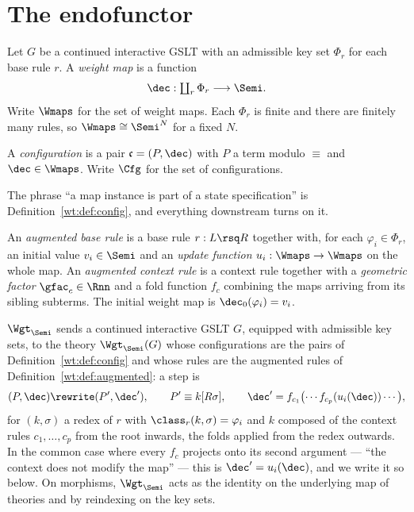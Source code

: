 \section{The endofunctor}

\begin{definition}
\label{wt:def:wmap}
Let $G$ be a continued interactive GSLT with an admissible key set $\Phi_r$ for each base
rule $r$. A \emph{weight map} is a function
\[
  \dec : \textstyle\coprod_r \Phi_r \longrightarrow \Semi .
\]
Write $\Wmaps$ for the set of weight maps. Each $\Phi_r$ is finite and there are finitely
many rules, so $\Wmaps \cong \Semi^N$ for a fixed $N$.
\end{definition}

\begin{definition}[Configuration]
\label{wt:def:config}
A \emph{configuration} is a pair $\mathfrak{c} = (P, \dec)$ with $P$ a term modulo
$\equiv$ and $\dec \in \Wmaps$. Write $\Cfg$ for the set of configurations.
\end{definition}

The phrase ``a map instance is part of a state specification'' is
Definition~\ref{wt:def:config}, and everything downstream turns on it.

\begin{definition}
\label{wt:def:augmented}
An \emph{augmented base rule} is a base rule $r : L \rsq R$ together with, for each
$\varphi_i \in \Phi_r$, an initial value $v_i \in \Semi$ and an \emph{update function}
$u_i : \Wmaps \to \Wmaps$ on the whole map. An \emph{augmented context rule} is a context
rule together with a \emph{geometric factor} $\gfac_c \in \Rnn$ and a fold function
$f_c$ combining the maps arriving from its sibling subterms. The initial weight map is
$\dec_0(\varphi_i) = v_i$.
\end{definition}

\begin{construction}
\label{wt:con:functor}
$\Wgt_{\Semi}$ sends a continued interactive GSLT $G$, equipped with admissible key sets,
to the theory $\Wgt_{\Semi}(G)$ whose configurations are the pairs of
Definition~\ref{wt:def:config} and whose rules are the augmented rules of
Definition~\ref{wt:def:augmented}: a step is
\[
  (P, \dec) \rewrite (P', \dec'),
  \qquad
  P' \equiv k[R\sigma],
  \qquad
  \dec' = f_{c_1}\bigl(\cdots f_{c_p}(u_i(\dec))\cdots\bigr),
\]
for $(k,\sigma)$ a redex of $r$ with $\class_r(k,\sigma) = \varphi_i$ and $k$ composed of
the context rules $c_1, \ldots, c_p$ from the root inwards, the folds applied from the
redex outwards. In the common case where every $f_c$ projects onto its second argument ---
``the context does not modify the map'' --- this is $\dec' = u_i(\dec)$, and we write it so
below. On morphisms, $\Wgt_{\Semi}$ acts as the identity on the underlying map of theories
and by reindexing on the key sets.
\end{construction}

